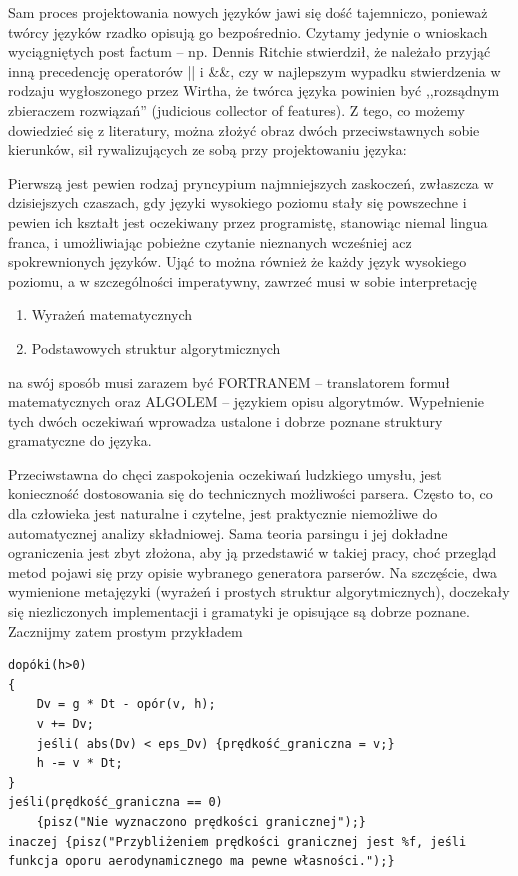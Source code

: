 Sam proces projektowania nowych języków jawi się dość tajemniczo, ponieważ twórcy języków rzadko opisują go bezpośrednio. Czytamy jedynie o wnioskach wyciągniętych post factum – np. Dennis Ritchie stwierdził, że należało przyjąć inną precedencję operatorów || i \&\&\cite{Ritchie_mail}, czy w najlepszym wypadku stwierdzenia w rodzaju wygłoszonego przez Wirtha, że twórca języka powinien być ,,rozsądnym zbieraczem rozwiązań'' (judicious collector of features)\cite{Wirth_recollections_Pascal}. Z tego, co możemy dowiedzieć się z literatury, można złożyć obraz dwóch przeciwstawnych sobie kierunków, sił rywalizujących ze sobą przy projektowaniu języka:

Pierwszą jest pewien rodzaj pryncypium najmniejszych zaskoczeń, zwłaszcza w dzisiejszych czaszach, gdy języki wysokiego poziomu stały się powszechne i pewien ich kształt jest oczekiwany przez programistę, stanowiąc niemal lingua franca, i umożliwiając pobieżne czytanie nieznanych wcześniej acz spokrewnionych języków. Ująć to można również  że każdy język wysokiego poziomu, a w szczególności imperatywny, zawrzeć musi w sobie interpretację
\begin{enumerate}[noitemsep, label=(\alph*)]
    \item Wyrażeń matematycznych
    \item Podstawowych struktur algorytmicznych
\end{enumerate}
na swój sposób musi zarazem być FORTRANEM – translatorem formuł matematycznych oraz ALGOLEM – językiem opisu algorytmów.
Wypełnienie tych dwóch oczekiwań wprowadza ustalone i dobrze poznane struktury gramatyczne do języka.

Przeciwstawna do chęci zaspokojenia oczekiwań ludzkiego umysłu, jest konieczność dostosowania się do technicznych możliwości parsera. Często to, co dla człowieka jest naturalne i czytelne, jest praktycznie niemożliwe do automatycznej analizy składniowej.  Sama teoria parsingu i jej dokładne ograniczenia jest zbyt złożona, aby ją przedstawić w takiej pracy, choć przegląd metod pojawi się przy opisie wybranego generatora parserów. Na szczęście, dwa wymienione metajęzyki (wyrażeń i prostych struktur algorytmicznych), doczekały się niezliczonych implementacji i gramatyki je opisujące są dobrze poznane. Zacznijmy zatem prostym przykładem


\begin{lstlisting}
dopóki(h>0)
{
    Dv = g * Dt - opór(v, h);
    v += Dv;
    jeśli( abs(Dv) < eps_Dv) {prędkość_graniczna = v;}
    h -= v * Dt;
}
jeśli(prędkość_graniczna == 0)
    {pisz("Nie wyznaczono prędkości granicznej");}
inaczej {pisz("Przybliżeniem prędkości granicznej jest %f, jeśli funkcja oporu aerodynamicznego ma pewne własności.");}
\end{lstlisting}



